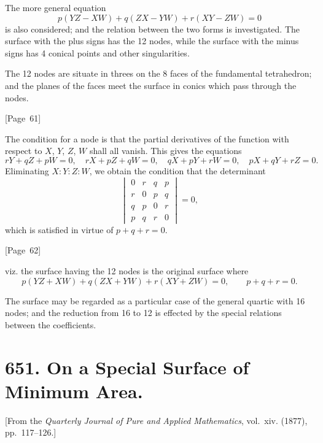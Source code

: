 \documentclass[11pt,a4paper]{book}
\begin{document}
The more general equation
\[
p(YZ - XW) + q(ZX - YW) + r(XY - ZW) = 0
\]
is also considered; and the relation between the two forms is
investigated. The surface with the plus signs has the 12 nodes, while
the surface with the minus signs has 4 conical points and other
singularities.

The 12 nodes are situate in threes on the 8 faces of the fundamental
tetrahedron; and the planes of the faces meet the surface in conics
which pass through the nodes.

\begin{center}
[Page~61]
\end{center}

The condition for a node is that the partial derivatives of the
function with respect to $X$, $Y$, $Z$, $W$ shall all vanish. This
gives the equations
\[
rY + qZ + pW = 0, \quad
rX + pZ + qW = 0, \quad
qX + pY + rW = 0, \quad
pX + qY + rZ = 0.
\]
Eliminating $X : Y : Z : W$, we obtain the condition that the
determinant
\[
\begin{vmatrix}
0 & r & q & p \\
r & 0 & p & q \\
q & p & 0 & r \\
p & q & r & 0
\end{vmatrix} = 0,
\]
which is satisfied in virtue of $p + q + r = 0$.

\begin{center}
[Page~62]
\end{center}

viz. the surface having the 12 nodes is the original surface where
\[
p(YZ + XW) + q(ZX + YW) + r(XY + ZW) = 0, \qquad p + q + r = 0.
\]

The surface may be regarded as a particular case of the general quartic
with 16 nodes; and the reduction from 16 to 12 is effected by the
special relations between the coefficients.


\newpage
\section*{651. On a Special Surface of Minimum Area.}

[From the \textit{Quarterly Journal of Pure and Applied Mathematics},
vol.~xiv. (1877), pp.~117--126.]
\end{document}
